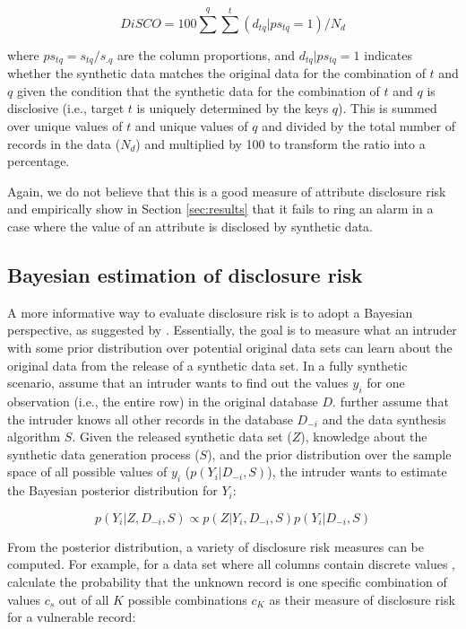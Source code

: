 \documentclass[a4paper,11pt]{style/uneceart}
\begin{document}
\begin{equation}
DiSCO = 100 \sum^{q} \sum^{t} (d_{tq} | ps_{tq} = 1) / N_{d}
\label{eq:DiSCO}
\end{equation}

where $ps_{tq} = s_{tq}/s_{.q}$ are the column proportions, and $d_{tq} | ps_{tq} = 1$ indicates whether the synthetic data matches the original data for the combination of $t$ and $q$ given the condition that the synthetic data for the combination of $t$ and $q$ is disclosive (i.e., target $t$ is uniquely determined by the keys $q$).  This is summed over unique values of $t$ and unique values of $q$ and divided by the total number of records in the data ($N_{d}$) and multiplied by 100 to transform the ratio into a percentage.

Again, we do not believe that this is a good measure of attribute disclosure risk and empirically show in Section \ref{sec:results} that it fails to ring an alarm in a case where the value of an attribute is disclosed by synthetic data.

\subsection{Bayesian estimation of disclosure risk}

A more informative way to evaluate disclosure risk is to adopt a Bayesian perspective, as suggested by \citet{reiter2014bayesian}. 
Essentially, the goal is to measure what an intruder with some prior distribution over potential original data sets can learn about the original data from the release of a synthetic data set. In a fully synthetic scenario, \citet{reiter2014bayesian} assume that an intruder wants to find out the values $y_i$ for one observation (i.e., the entire row) in the original database $D$. \citet{reiter2014bayesian} further assume that the intruder knows all other records in the database $D_{-i}$ and the data synthesis algorithm $S$. Given the released synthetic data set ($Z$), knowledge about the synthetic data generation process ($S$), and the prior distribution over the sample space of all possible values of $y_i$ ($p(Y_i|D_{-i}, S)$), the intruder wants to estimate the Bayesian posterior distribution for $Y_i$:

\begin{equation*}
    p(Y_i|Z,D_{-i},S) \propto p(Z|Y_i, D_{-i}, S)p(Y_i|D_{-i}, S)
\end{equation*}

From the posterior distribution, a variety of disclosure risk measures can be computed. For example, for a data set where all columns contain discrete values \citet{reiter2014bayesian}, calculate the probability that the unknown record is one specific combination of values $c_s$ out of all $K$ possible combinations $c_K$ as their measure of disclosure risk for a vulnerable record:
\end{document}
